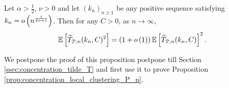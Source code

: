%

\begin{proposition}\label{prop:concentration_tilde_T_P_n}
Let $\alpha > \frac{1}{2}$, $\nu > 0$ and let $(k_n)_{n \ge 1}$ be any positive sequence satisfying $k_n = o\left(n^{\frac{1}{2\alpha+1}}\right)$. Then for any $C > 0$, as $n \to \infty$,
\[
	\mathbb{E}\left[\widetilde{T}_{{\mathcal P},n}(k_n,C)^2\right] = \left(1 + o\left(1\right)\right)\mathbb{E}\left[\widetilde{T}_{{\mathcal P},n}(k_n, C)\right]^2.
\]
\end{proposition}

We postpone the proof of this proposition postpone till Section \ref{ssec:concentration_tilde_T} and first use it to prove Proposition \ref{prop:concentration_local_clustering_P_n}. 

